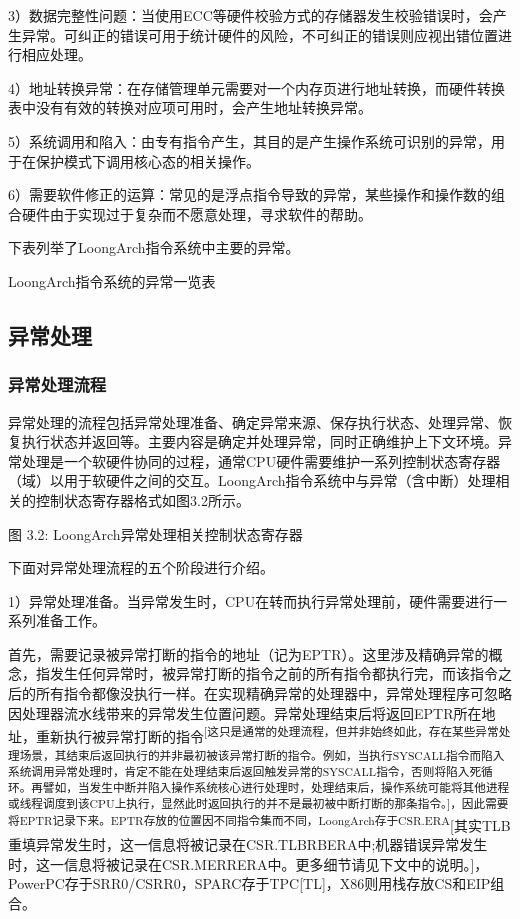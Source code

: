 \documentclass[]{ctexbook}
\begin{document}
3）数据完整性问题：当使用ECC等硬件校验方式的存储器发生校验错误时，会产生异常。可纠正的错误可用于统计硬件的风险，不可纠正的错误则应视出错位置进行相应处理。

4）地址转换异常：在存储管理单元需要对一个内存页进行地址转换，而硬件转换表中没有有效的转换对应项可用时，会产生地址转换异常。

5）系统调用和陷入：由专有指令产生，其目的是产生操作系统可识别的异常，用于在保护模式下调用核心态的相关操作。

6）需要软件修正的运算：常见的是浮点指令导致的异常，某些操作和操作数的组合硬件由于实现过于复杂而不愿意处理，寻求软件的帮助。

下表列举了LoongArch指令系统中主要的异常。

\label{tab:exception}LoongArch指令系统的异常一览表

\hypertarget{ux5f02ux5e38ux5904ux7406}{%
\subsection{异常处理}\label{ux5f02ux5e38ux5904ux7406}}

\hypertarget{ux5f02ux5e38ux5904ux7406ux6d41ux7a0b}{%
\subsubsection{异常处理流程}\label{ux5f02ux5e38ux5904ux7406ux6d41ux7a0b}}

异常处理的流程包括异常处理准备、确定异常来源、保存执行状态、处理异常、恢复执行状态并返回等。主要内容是确定并处理异常，同时正确维护上下文环境。异常处理是一个软硬件协同的过程，通常CPU硬件需要维护一系列控制状态寄存器（域）以用于软硬件之间的交互。LoongArch指令系统中与异常（含中断）处理相关的控制状态寄存器格式如图3.2所示。

图 3.2: LoongArch异常处理相关控制状态寄存器

下面对异常处理流程的五个阶段进行介绍。

1）异常处理准备。当异常发生时，CPU在转而执行异常处理前，硬件需要进行一系列准备工作。

首先，需要记录被异常打断的指令的地址（记为EPTR）。这里涉及精确异常的概念，指发生任何异常时，被异常打断的指令之前的所有指令都执行完，而该指令之后的所有指令都像没执行一样。在实现精确异常的处理器中，异常处理程序可忽略因处理器流水线带来的异常发生位置问题。异常处理结束后将返回EPTR所在地址，重新执行被异常打断的指令\textsuperscript{{[}这只是通常的处理流程，但并非始终如此，存在某些异常处理场景，其结束后返回执行的并非最初被该异常打断的指令。例如，当执行SYSCALL指令而陷入系统调用异常处理时，肯定不能在处理结束后返回触发异常的SYSCALL指令，否则将陷入死循环。再譬如，当发生中断并陷入操作系统核心进行处理时，处理结束后，操作系统可能将其他进程或线程调度到该CPU上执行，显然此时返回执行的并不是最初被中断打断的那条指令。{]}，因此需要将EPTR记录下来。EPTR存放的位置因不同指令集而不同，LoongArch存于CSR.ERA}{[}其实TLB重填异常发生时，这一信息将被记录在CSR.TLBRBERA中;机器错误异常发生时，这一信息将被记录在CSR.MERRERA中。更多细节请见下文中的说明。{]}，PowerPC存于SRR0/CSRR0，SPARC存于TPC{[}TL{]}，X86则用栈存放CS和EIP组合。
\end{document}
